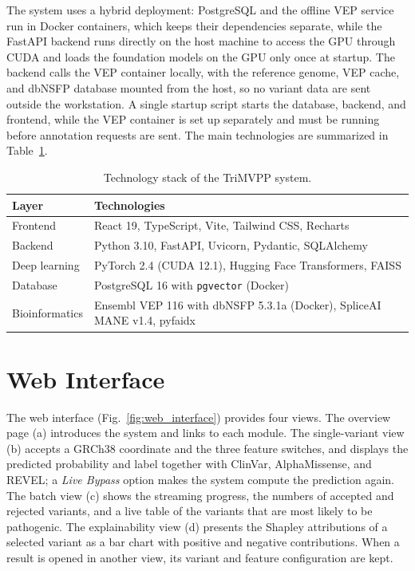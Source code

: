 The system uses a hybrid deployment: PostgreSQL and the offline VEP service run in Docker containers, which keeps their dependencies separate, while the FastAPI backend runs directly on the host machine to access the GPU through CUDA and loads the foundation models on the GPU only once at startup. The backend calls the VEP container locally, with the reference genome, VEP cache, and dbNSFP database mounted from the host, so no variant data are sent outside the workstation. A single startup script starts the database, backend, and frontend, while the VEP container is set up separately and must be running before annotation requests are sent. The main technologies are summarized in Table~\ref{tab:tech_stack}.

\begin{table}[htbp]
    \centering
    \caption{Technology stack of the TriMVPP system.}
    \label{tab:tech_stack}
    \begin{tabular}{ll}
        \toprule
        \textbf{Layer} & \textbf{Technologies} \\
        \midrule
        Frontend & React 19, TypeScript, Vite, Tailwind CSS, Recharts \\
        Backend & Python 3.10, FastAPI, Uvicorn, Pydantic, SQLAlchemy \\
        Deep learning & PyTorch 2.4 (CUDA 12.1), Hugging Face Transformers, FAISS \\
        Database & PostgreSQL 16 with \texttt{pgvector} (Docker) \\
        Bioinformatics & Ensembl VEP 116 with dbNSFP 5.3.1a (Docker), SpliceAI MANE v1.4, pyfaidx \\
        \bottomrule
    \end{tabular}
\end{table}

\section{Web Interface}
\label{sec:web_interface}

The web interface (Fig.~\ref{fig:web_interface}) provides four views. The overview page (a) introduces the system and links to each module. The single-variant view (b) accepts a GRCh38 coordinate and the three feature switches, and displays the predicted probability and label together with ClinVar, AlphaMissense, and REVEL; a \textit{Live Bypass} option makes the system compute the prediction again. The batch view (c) shows the streaming progress, the numbers of accepted and rejected variants, and a live table of the variants that are most likely to be pathogenic. The explainability view (d) presents the Shapley attributions of a selected variant as a bar chart with positive and negative contributions. When a result is opened in another view, its variant and feature configuration are kept.


